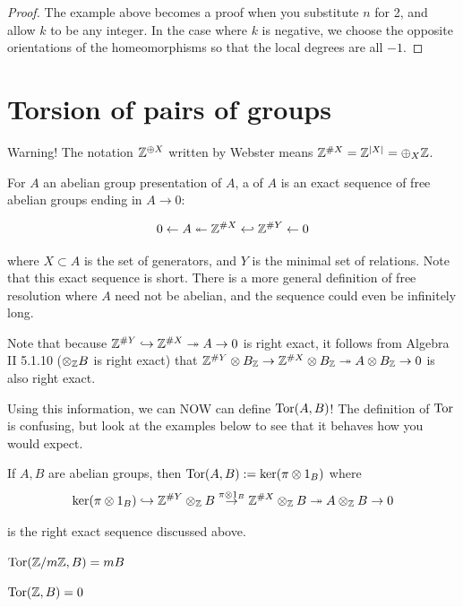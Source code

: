 \documentclass[11pt,leqno,oneside]{amsart}
\newenvironment{dateenv}{
  \vspace{1em}
}{
  \vspace{1em}
}
\newcommand{\mydate}[4]{
  \newdate{#1}{#2}{#3}{#4}
  \begin{dateenv}
    \hfill\displaydate{#1}
  \end{dateenv}
}
\numberwithin{thm}{section}
\begin{document}
\begin{proof}
  The example above becomes a proof when you substitute $n$ for 2, and allow $k$ to be any integer.  In the case where $k$ is negative, we choose the opposite orientations of the homeomorphisms so that the local degrees are all $-1$.
\end{proof}


\mydate{dk}{17}{4}{2017}

\section*{Torsion of pairs of groups}

Warning!  The notation ${\mathbb Z}^{\oplus X}$ written by Webster means ${\mathbb Z}^{\#X} = {\mathbb Z}^{|X|} = \oplus_X {\mathbb Z}$.

\begin{defn}
  For $A$ an abelian group presentation of $A$, a  of $A$ is an exact sequence of free abelian groups ending in $A \to 0$:

  $$0 \leftarrow A \twoheadleftarrow {\mathbb Z}^{\# X} \hookleftarrow {\mathbb Z}^{\# Y} \leftarrow 0$$

  where $X \subset A$ is the set of generators, and $Y$ is the minimal set of relations.  Note that this exact sequence is short.  There is a more general definition of free resolution where $A$ need not be abelian, and the sequence could even be infinitely long.
\end{defn}

Note that because ${\mathbb Z}^{\# Y} \hookrightarrow {\mathbb Z}^{\# X} \twoheadrightarrow A \to 0$ is right exact, it follows from Algebra II 5.1.10 ($\otimes_{\mathbb Z} B$ is right exact) that ${\mathbb Z}^{\# Y} \otimes B_{\mathbb Z} \to {\mathbb Z}^{\# X} \otimes B_{\mathbb Z} \twoheadrightarrow A \otimes B_{\mathbb Z} \to 0$ is also right exact.

Using this information, we can NOW can define $\operatorname{Tor}(A, B)$!  The definition of $\operatorname{Tor}$ is confusing, but look at the examples below to see that it behaves how you would expect.

\begin{defn}
  If $A, B$ are abelian groups, then $\operatorname{Tor}(A, B) := \ker(\pi \otimes 1_B)$ where
  $$\ker(\pi \otimes 1_B) \hookrightarrow {\mathbb Z}^{\# Y} \otimes_{\mathbb Z} B \overset{\pi \otimes 1_B}{\to} {\mathbb Z}^{\# X} \otimes_{\mathbb Z} B \twoheadrightarrow A \otimes_{\mathbb Z} B \to 0$$

  is the right exact sequence discussed above.
\end{defn}
\begin{example}
  $\operatorname{Tor}({\mathbb Z}/m{\mathbb Z}, B) = mB$
\end{example}
\begin{example}
  $\operatorname{Tor}({\mathbb Z}, B) = 0$
\end{example}
\end{document}
